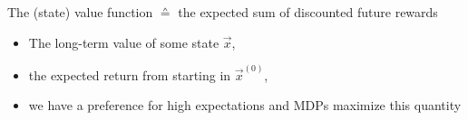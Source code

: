 
\begin{frame}\frametitle{\subsecname}

The (state) value function $\corresponds$ the expected sum of discounted future rewards


\begin{itemize}
\item The long-term value of some state $\vec x$,
\item the expected return from starting in $\vec x^{(0)}$,
\item we have a preference for high expectations and MDPs maximize this quantity
\end{itemize}

\end{frame}

